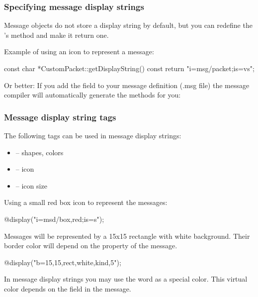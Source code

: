 \subsubsection{Specifying message display strings}
Message objects do not store a display string by default, but you can redefine
the 's  method and make it return
one.

Example of using an icon to represent a message:

\begin{cpp}
const char *CustomPacket::getDisplayString() const
{
    return "i=msg/packet;is=vs";
}
\end{cpp}

Or better: If you add the field  to your message
definition (.msg file) the message compiler will automatically generate
the  methods for you:

\begin{msg}
message Job
{
    string displayString = "i=msg/package_s,kind";
...
\end{msg}

\subsubsection{Message display string tags}

The following tags can be used in message display strings:
\begin{itemize}
  \item{ -- shapes, colors}
  \item{ -- icon}
  \item{ -- icon size}
\end{itemize}

Using a small red box icon to represent the messages:

\begin{ned}
@display("i=msd/box,red;is=s");
\end{ned}

Messages will be represented by a 15x15 rectangle with white background.
Their border color will depend on the  property of the message.

\begin{ned}
@display("b=15,15,rect,white,kind,5");
\end{ned}

\begin{note}
   In message display strings you may use the word  as a special color.
   This virtual color depends on the  field in the message.
\end{note}


